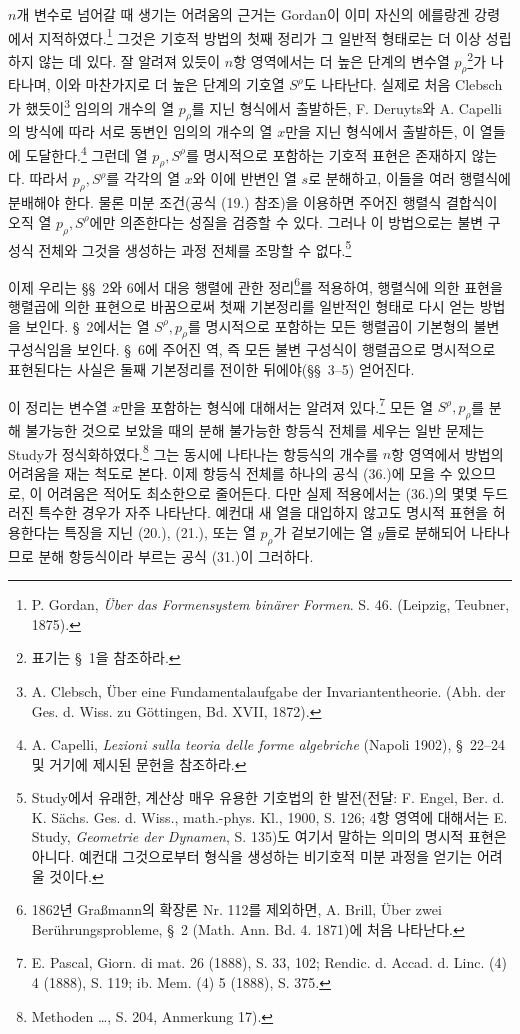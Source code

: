 $n$개 변수로 넘어갈 때 생기는 어려움의 근거는 Gordan이 이미 자신의 에를랑겐 강령에서 지적하였다.\footnote{P. Gordan, \emph{Über das Formensystem binärer Formen}. S. 46. (Leipzig, Teubner, 1875).} 그것은 기호적 방법의 첫째 정리가 그 일반적 형태로는 더 이상 성립하지 않는 데 있다. 잘 알려져 있듯이 $n$항 영역에서는 더 높은 단계의 변수열 $p_\rho$\footnote{표기는 \S\ 1을 참조하라.}가 나타나며, 이와 마찬가지로 더 높은 단계의 기호열 $S^\rho$도 나타난다. 실제로 처음 Clebsch가 했듯이\footnote{A. Clebsch, Über eine Fundamentalaufgabe der Invariantentheorie. (Abh. der Ges. d. Wiss. zu Göttingen, Bd. XVII, 1872).} 임의의 개수의 열 $p_\rho$를 지닌 형식에서 출발하든, F. Deruyts와 A. Capelli의 방식에 따라 서로 동변인 임의의 개수의 열 $x$만을 지닌 형식에서 출발하든, 이 열들에 도달한다.\footnote{A. Capelli, \emph{Lezioni sulla teoria delle forme algebriche} (Napoli 1902), \S\ 22--24 및 거기에 제시된 문헌을 참조하라.} 그런데 열 $p_\rho,S^\rho$를 명시적으로 포함하는 기호적 표현은 존재하지 않는다. 따라서 $p_\rho,S^\rho$를 각각의 열 $x$와 이에 반변인 열 $s$로 분해하고, 이들을 여러 행렬식에 분배해야 한다. 물론 미분 조건(공식 (19.) 참조)을 이용하면 주어진 행렬식 결합식이 오직 열 $p_\rho,S^\rho$에만 의존한다는 성질을 검증할 수 있다. 그러나 이 방법으로는 불변 구성식 전체와 그것을 생성하는 과정 전체를 조망할 수 없다.\footnote{Study에서 유래한, 계산상 매우 유용한 기호법의 한 발전(전달: F. Engel, Ber. d. K. Sächs. Ges. d. Wiss., math.-phys. Kl., 1900, S. 126; 4항 영역에 대해서는 E. Study, \emph{Geometrie der Dynamen}, S. 135)도 여기서 말하는 의미의 명시적 표현은 아니다. 예컨대 그것으로부터 형식을 생성하는 비기호적 미분 과정을 얻기는 어려울 것이다.}

이제 우리는 \S\S\ 2와 6에서 \glqq{}대응 행렬에 관한 정리\grqq{}\footnote{1862년 Graßmann의 확장론 Nr. 112를 제외하면, A. Brill, Über zwei Berührungsprobleme, \S\ 2 (Math. Ann. Bd. 4. 1871)에 처음 나타난다.}를 적용하여, 행렬식에 의한 표현을 \glqq{}행렬곱\grqq{}에 의한 표현으로 바꿈으로써 첫째 기본정리를 일반적인 형태로 다시 얻는 방법을 보인다. \S\ 2에서는 열 $S^\rho,p_\rho$를 명시적으로 포함하는 모든 행렬곱이 기본형의 불변 구성식임을 보인다. \S\ 6에 주어진 역, 즉 모든 불변 구성식이 행렬곱으로 명시적으로 표현된다는 사실은 둘째 기본정리를 전이한 뒤에야(\S\S\ 3--5) 얻어진다.

이 정리는 변수열 $x$만을 포함하는 형식에 대해서는 알려져 있다.\footnote{E. Pascal, Giorn. di mat. 26 (1888), S. 33, 102; Rendic. d. Accad. d. Linc. (4) 4 (1888), S. 119; ib. Mem. (4) 5 (1888), S. 375.} 모든 열 $S^\rho,p_\rho$를 분해 불가능한 것으로 보았을 때의 분해 불가능한 항등식 전체를 세우는 일반 문제는 Study가 정식화하였다.\footnote{\glqq{}Methoden \dots\grqq{}, S. 204, Anmerkung 17).} 그는 동시에 나타나는 항등식의 개수를 $n$항 영역에서 방법의 어려움을 재는 척도로 본다. 이제 항등식 전체를 하나의 공식 (36.)에 모을 수 있으므로, 이 어려움은 적어도 최소한으로 줄어든다. 다만 실제 적용에서는 (36.)의 몇몇 두드러진 특수한 경우가 자주 나타난다. 예컨대 새 열을 대입하지 않고도 명시적 표현을 허용한다는 특징을 지닌 (20.), (21.), 또는 열 $p_\rho$가 겉보기에는 열 $y$들로 분해되어 나타나므로 \glqq{}분해 항등식\grqq{}이라 부르는 공식 (31.)이 그러하다.

